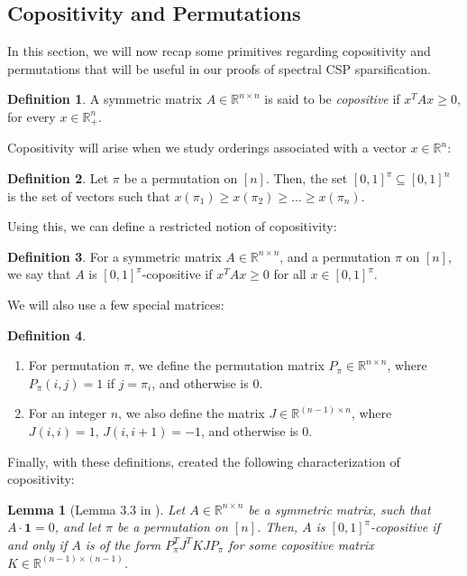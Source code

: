 \documentclass[11pt]{article}
\newtheorem{lemma}[theorem]{Lemma}
\theoremstyle{definition}
\newtheorem{definition}{Definition}[section]
\newcommand{\R}{\mathbb{R}}
\begin{document}
\subsection{Copositivity and Permutations}

In this section, we will now recap some primitives regarding copositivity and permutations that will be useful in our proofs of spectral CSP sparsification. 
\begin{definition}
    A symmetric matrix $A \in \R^{n \times n}$ is said to be \emph{copositive} if $x^T A x \geq 0$, for every $x \in \R_+^{n}$.
\end{definition}

Copositivity will arise when we study orderings associated with a vector $x \in \R^n$:

\begin{definition}
    Let $\pi$ be a permutation on $[n]$. Then, the set $[0,1]^{\pi} \subseteq [0,1]^n$ is the set of vectors such that $x(\pi_1) \geq x(\pi_2) \geq \dots \geq x(\pi_n)$.
\end{definition}

Using this, we can define a restricted notion of copositivity:

\begin{definition}
    For a symmetric matrix $A \in \R^{n \times n}$, and a permutation $\pi$ on $[n]$, we say that $A$ is $[0,1]^{\pi}$-copositive if $x^T A x \geq 0$ for all $x \in [0,1]^{\pi}$.
\end{definition}

We will also use a few special matrices: 

\begin{definition}\label{def:specialMatrices}
\begin{enumerate}
    \item For permutation $\pi$, we define the permutation matrix $P_{\pi} \in \R^{n \times n}$, where $P_{\pi}(i,j) = 1$ if $j = \pi_i$, and otherwise is $0$.
    \item For an integer $n$, we also define the matrix $J \in \R^{(n-1) \times n}$, where $J(i,i) = 1$, $J(i, i+1) = -1$, and otherwise is $0$.
\end{enumerate}
\end{definition}

Finally, with these definitions, \cite{SY19} created the following characterization of copositivity:

\begin{lemma}[Lemma 3.3 in \cite{SY19}]\label{lem:PSDtoCopos}
    Let $A \in \R^{n \times n}$ be a symmetric matrix, such that $A \cdot \mathbf{1} = 0$, and let $\pi$ be a permutation on $[n]$. Then, $A$ is $[0,1]^{\pi}$-copositive if and only if $A$ is of the form $P_{\pi}^T J^T K J P_{\pi}$ for some copositive matrix $K \in \R^{(n-1) \times (n-1)}$.
\end{lemma}
\end{document}
